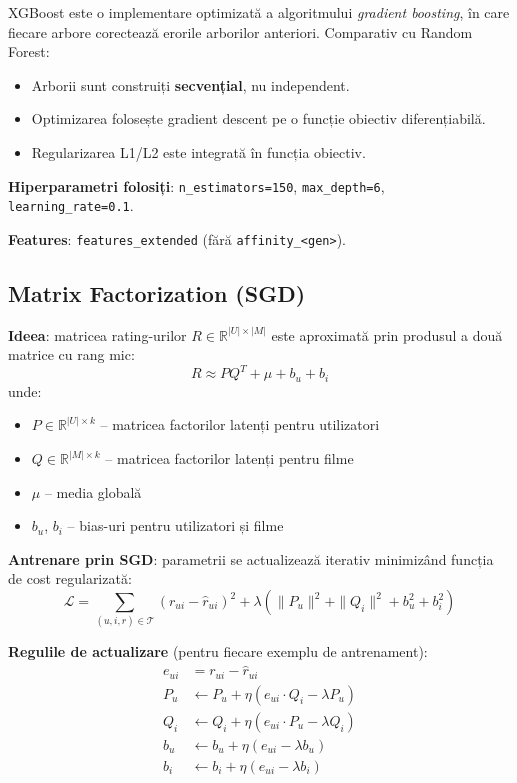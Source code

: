 \documentclass[12pt,a4paper]{article}
\begin{document}
XGBoost este o implementare optimizată a algoritmului \textit{gradient boosting}, în care fiecare arbore corectează erorile arborilor anteriori. Comparativ cu Random Forest:
\begin{itemize}[noitemsep]
    \item Arborii sunt construiți \textbf{secvențial}, nu independent.
    \item Optimizarea folosește gradient descent pe o funcție obiectiv diferențiabilă.
    \item Regularizarea L1/L2 este integrată în funcția obiectiv.
\end{itemize}

\textbf{Hiperparametri folosiți}: \texttt{n\_estimators=150}, \texttt{max\_depth=6}, \texttt{learning\_rate=0.1}.

\textbf{Features}: \texttt{features\_extended} (fără \texttt{affinity\_<gen>}).

\subsection{Matrix Factorization (SGD)}

\textbf{Ideea}: matricea rating-urilor $R \in \mathbb{R}^{|U|\times|M|}$ este aproximată prin produsul a două matrice cu rang mic:
$$R \approx P Q^T + \mu + b_u + b_i$$
unde:
\begin{itemize}[noitemsep]
    \item $P \in \mathbb{R}^{|U|\times k}$ -- matricea factorilor latenți pentru utilizatori
    \item $Q \in \mathbb{R}^{|M|\times k}$ -- matricea factorilor latenți pentru filme
    \item $\mu$ -- media globală
    \item $b_u$, $b_i$ -- bias-uri pentru utilizatori și filme
\end{itemize}

\textbf{Antrenare prin SGD}: parametrii se actualizează iterativ minimizând funcția de cost regularizată:
$$\mathcal{L} = \sum_{(u,i,r) \in \mathcal{T}} (r_{ui} - \hat{r}_{ui})^2 + \lambda \left(\|P_u\|^2 + \|Q_i\|^2 + b_u^2 + b_i^2\right)$$

\textbf{Regulile de actualizare} (pentru fiecare exemplu de antrenament):
\begin{align*}
e_{ui} &= r_{ui} - \hat{r}_{ui} \\
P_u &\leftarrow P_u + \eta (e_{ui} \cdot Q_i - \lambda P_u) \\
Q_i &\leftarrow Q_i + \eta (e_{ui} \cdot P_u - \lambda Q_i) \\
b_u &\leftarrow b_u + \eta (e_{ui} - \lambda b_u) \\
b_i &\leftarrow b_i + \eta (e_{ui} - \lambda b_i)
\end{align*}
\end{document}
